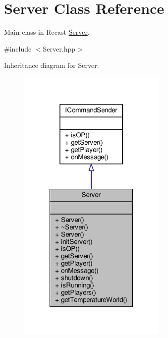 \hypertarget{class_server}{\section{Server Class Reference}
\label{class_server}
}


Main class in Recast \hyperlink{class_server}{Server}.  




{\ttfamily \#include $<$Server.\-hpp$>$}



Inheritance diagram for Server\-:
\nopagebreak
\begin{figure}[H]
\begin{center}
\leavevmode
\includegraphics[width=204pt]{class_server__inherit__graph}
\end{center}
\end{figure}


